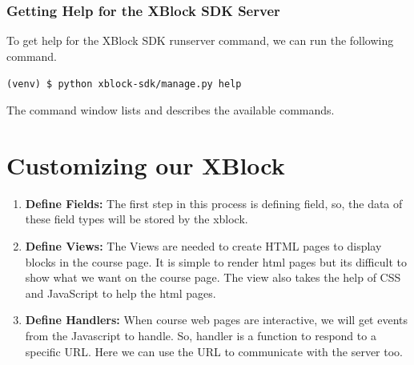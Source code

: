\subsubsection{Getting Help for the XBlock SDK Server}
To get help for the XBlock SDK runserver command, we can run the following
command.
\begin{center}\verb=(venv) $ python xblock-sdk/manage.py help=\end{center}
The command window lists and describes the available commands.



\section{Customizing our XBlock}
\begin{enumerate}
\item \textbf{Define Fields:}\newline
The first step in this process is defining field, so, the data of these field types will be
stored by the xblock.
\item\textbf{ Define Views:}\newline
The Views are needed to create HTML pages to display blocks in the course page. It
is simple to render html pages but its difficult to show what we want on the course
page. The view also takes the help of CSS and JavaScript to help the html pages.
\item \textbf{Define Handlers:}\newline
When course web pages are interactive, we will get events from the Javascript to
handle. So, handler is a function to respond to a specific URL. Here we can use the
URL to communicate with the server too.
\end{enumerate}



